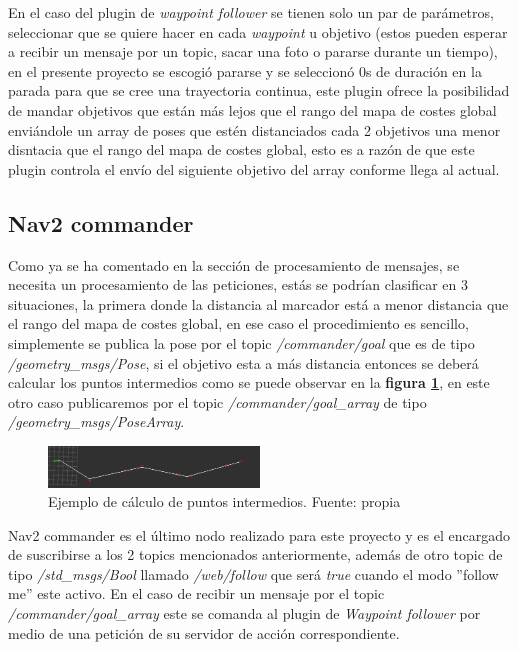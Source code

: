 En el caso del plugin de \textit{waypoint follower} se tienen solo un par de parámetros, seleccionar que se quiere hacer en cada \textit{waypoint} u 
objetivo (estos pueden esperar a recibir un mensaje por un topic, sacar una foto o pararse durante un tiempo), en el presente proyecto se escogió pararse y se seleccionó 0s de 
duración en la parada para que se cree una trayectoria continua, este plugin ofrece la posibilidad de mandar objetivos que están más lejos que el rango del 
mapa de costes global enviándole un array de poses que estén distanciados cada 2 objetivos una menor disntacia que el rango del mapa de costes global, esto es a razón de 
que este plugin controla el envío del siguiente objetivo del array conforme llega al actual.

\subsection{Nav2 commander}
Como ya se ha comentado en la sección de procesamiento de mensajes, se necesita un procesamiento de las peticiones, estás se podrían clasificar en 3 situaciones, la primera 
donde la distancia al marcador está a menor distancia que el rango del mapa de costes global, en ese caso el procedimiento es sencillo, simplemente se publica la pose por el topic 
\textit{/commander/goal} que es de tipo \textit{/geometry\_msgs/Pose}, si el objetivo esta a más distancia entonces se deberá calcular los puntos intermedios como se puede observar en la 
\textbf{figura \ref{fig:puntos_intermedios}}, en este otro caso publicaremos por el topic \textit{/commander/goal\_array} de tipo \textit{/geometry\_msgs/PoseArray}.


\begin{figure}[H]
    \centering
    \includegraphics[width=0.5\textwidth]{images/camino_punto_inter.png}
    \caption{Ejemplo de cálculo de puntos intermedios. Fuente: propia}
    \label{fig:puntos_intermedios}
\end{figure}

Nav2 commander es el último nodo realizado para este proyecto y es el encargado de suscribirse a los 2 topics mencionados anteriormente, 
además de otro topic de tipo \textit{/std\_msgs/Bool} llamado \textit{/web/follow} que será \textit{true} cuando el modo ''follow me'' este activo. En 
el caso de recibir un mensaje por el topic \textit{/commander/goal\_array} este se comanda al plugin de \textit{Waypoint follower} por medio de 
una petición de su servidor de acción correspondiente.

